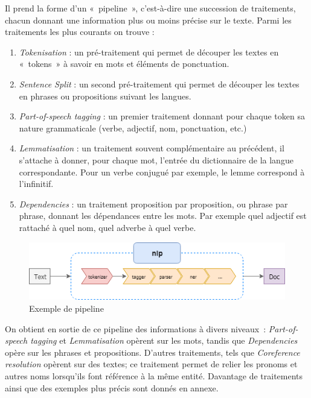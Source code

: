 Il prend la forme d'un «~pipeline~», c'est-à-dire une succession de traitements, chacun donnant une information plus ou moins précise sur le texte. Parmi les traitements les plus courants on trouve :
\begin{enumerate}
    \item \textit{Tokenisation} : un pré-traitement qui permet de découper les textes en «~tokens~» à savoir en mots et éléments de ponctuation.
    \vspace{5pt}
    \item \textit{Sentence Split} : un second pré-traitement qui permet de découper les textes en phrases ou propositions suivant les langues.
    \vspace{5pt}
    \item \textit{Part-of-speech tagging} : un premier traitement donnant pour chaque token sa nature grammaticale (verbe, adjectif, nom, ponctuation, etc.)
    \vspace{5pt}
    \item \textit{Lemmatisation} : un traitement souvent complémentaire au précédent, il s'attache à donner, pour chaque mot, l'entrée du dictionnaire de la langue correspondante. Pour un verbe conjugué par exemple, le lemme correspond à l'infinitif.
    \vspace{5pt}
    \item \textit{Dependencies} : un traitement proposition par proposition, ou phrase par phrase, donnant les dépendances entre les mots. Par exemple quel adjectif est rattaché à quel nom, quel adverbe à quel verbe.
\end{enumerate}
\vspace{10pt}

\begin{figure}[H]
    \centering
    \includegraphics[scale=0.8]{images/Pipeline-example.png}
    \caption{Exemple de pipeline}
    \label{fig:nlp-pipeline-example}
\end{figure}

\vspace{10pt}

On obtient en sortie de ce pipeline des informations à divers niveaux~: \textit{Part-of-speech tagging} et \textit{Lemmatisation} opèrent sur les mots, tandis que \textit{Dependencies} opère sur les phrases et propositions. D'autres traitements, tels que \textit{Coreference resolution} opèrent sur des textes; ce traitement permet de relier les pronoms et autres noms lorsqu'ils font référence à la même entité. Davantage de traitements ainsi que des exemples plus précis sont donnés en annexe.
\newline

